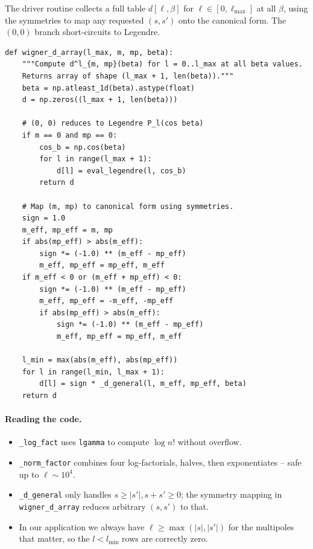The driver routine collects a full table $d[\ell, \beta]$ for $\ell \in [0, \ell_\mathrm{max}]$ at all $\beta$, using the symmetries to map any requested $(s, s')$ onto the canonical form. The $(0, 0)$ branch short-circuits to Legendre.

\begin{codebox}
\begin{lstlisting}[style=python]
def wigner_d_array(l_max, m, mp, beta):
    """Compute d^l_{m, mp}(beta) for l = 0..l_max at all beta values.
    Returns array of shape (l_max + 1, len(beta))."""
    beta = np.atleast_1d(beta).astype(float)
    d = np.zeros((l_max + 1, len(beta)))

    # (0, 0) reduces to Legendre P_l(cos beta)
    if m == 0 and mp == 0:
        cos_b = np.cos(beta)
        for l in range(l_max + 1):
            d[l] = eval_legendre(l, cos_b)
        return d

    # Map (m, mp) to canonical form using symmetries.
    sign = 1.0
    m_eff, mp_eff = m, mp
    if abs(mp_eff) > abs(m_eff):
        sign *= (-1.0) ** (m_eff - mp_eff)
        m_eff, mp_eff = mp_eff, m_eff
    if m_eff < 0 or (m_eff + mp_eff) < 0:
        sign *= (-1.0) ** (m_eff - mp_eff)
        m_eff, mp_eff = -m_eff, -mp_eff
        if abs(mp_eff) > abs(m_eff):
            sign *= (-1.0) ** (m_eff - mp_eff)
            m_eff, mp_eff = mp_eff, m_eff

    l_min = max(abs(m_eff), abs(mp_eff))
    for l in range(l_min, l_max + 1):
        d[l] = sign * _d_general(l, m_eff, mp_eff, beta)
    return d
\end{lstlisting}
\end{codebox}

\paragraph{Reading the code.}
\begin{itemize}
  \item \texttt{\_log\_fact} uses \texttt{lgamma} to compute $\log n!$ without overflow.
  \item \texttt{\_norm\_factor} combines four log-factorials, halves, then exponentiates -- safe up to $\ell \sim 10^4$.
  \item \texttt{\_d\_general} only handles $s \geq |s'|, s + s' \geq 0$; the symmetry mapping in \texttt{wigner\_d\_array} reduces arbitrary $(s, s')$ to that.
  \item In our application we always have $\ell \geq \max(|s|, |s'|)$ for the multipoles that matter, so the $l < l_\mathrm{min}$ rows are correctly zero.
\end{itemize}

